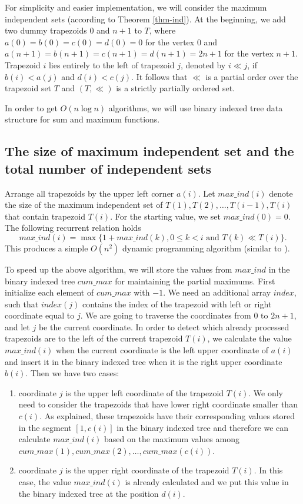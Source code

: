 \documentclass[11pt,letter]{article}
\begin{document}
For simplicity and easier implementation, we will consider the maximum independent sets (according
to Theorem \ref{thm-ind}). At the beginning, we add two dummy trapezoids $0$ and $n + 1$ to $T$,
where $a(0) = b(0) = c(0) = d(0) = 0$ for the vertex 0 and $a(n+1) =b(n+1) = c(n+1) =d(n+1) = 2n+1$
for the vertex $n + 1$. Trapezoid $i$ lies entirely to the left of trapezoid $j$, denoted by $i \ll
j$, if $b(i) < a(j)$ and $d(i) < c( j)$. It follows that $\ll$ is a partial order over the
trapezoid set $T$ and $(T ,\ll)$ is a strictly partially ordered set.

In order to get $O (n \log n)$ algorithms, we will use binary indexed tree data structure for sum
and maximum functions.


\subsection{The size of maximum independent set and the total number of independent sets}


Arrange all trapezoids by the upper left corner $a (i)$. Let $max\_ind (i)$ denote the size of the
maximum independent set of $T(1), T(2), \ldots, T(i-1), T (i)$ that contain trapezoid $T(i)$. For
the starting value, we set $max\_ind (0) = 0$. The following recurrent relation holds
$$
max\_ind (i) = \max \{1 + max\_ind (k), 0 \leq k < i \mbox{ and } T (k) \ll T (i) \}.
$$
This produces a simple $O (n^2)$ dynamic programming algorithm (similar to \cite{LiCh09}).



To speed up the above algorithm, we will store the values from $max\_ind$ in the binary indexed
tree $cum\_max$ for maintaining the partial maximums. First initialize each element of $cum\_max$
with $-1$. We need an additional array $index$, such that $index (j)$ contains the index of the
trapezoid with left or right coordinate equal to $j$. We are going to traverse the coordinates from
$0$ to $2n + 1$, and let $j$ be the current coordinate. In order to detect which already processed
trapezoids are to the left of the current trapezoid $T (i)$, we calculate the value $max\_ind (i)$
when the current coordinate is the left upper coordinate of $a (i)$ and insert it in the binary
indexed tree when it is the right upper coordinate $b (i)$. Then we have two cases:

\begin{enumerate}[($i$)]
\item coordinate $j$ is the upper left coordinate of the trapezoid $T (i)$.
We only need to consider the trapezoids that have lower right coordinate smaller than $c (i)$. As
explained, these trapezoids have their corresponding values stored in the segment $[1, c(i)]$ in
the binary indexed tree and therefore we can calculate $max\_ind (i)$ based on the maximum values
among $cum\_max(1), cum\_max(2), \ldots, cum\_max(c(i))$.

\item coordinate $j$ is the upper right coordinate of the trapezoid $T (i)$. In this case,
the value $max\_ind (i)$ is already calculated and we put this value in the binary indexed tree at
the position $d (i)$.
\end{enumerate}
\end{document}
